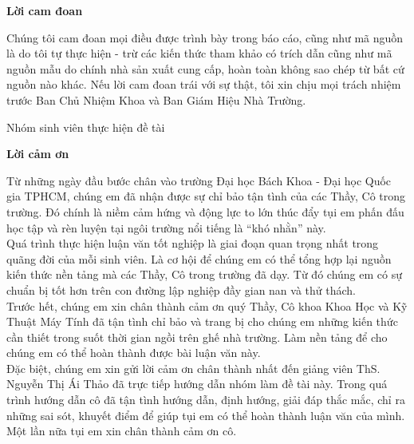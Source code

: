 \thispagestyle{empty}
\begin{center}
    \Large
    \textbf{Lời cam đoan}
    \vspace{1cm}
\end{center}

Chúng tôi cam đoan mọi điều được trình bày trong báo cáo, cũng như mã nguồn là do tôi tự thực hiện - trừ các kiến thức tham khảo có trích dẫn cũng như mã nguồn mẫu do chính nhà sản xuất cung cấp, hoàn toàn không sao chép từ bất cứ nguồn nào khác.
Nếu lời cam đoan trái với sự thật, tôi xin chịu mọi trách nhiệm trước Ban Chủ Nhiệm Khoa và Ban Giám Hiệu Nhà Trường.
\begin{flushright}
Nhóm sinh viên thực hiện đề tài\\

\end{flushright}

\newpage
\thispagestyle{plain}
\begin{center}
    \Large
    \textbf{Lời cảm ơn}
    \vspace{1cm}
\end{center}

Từ những ngày đầu bước chân vào trường Đại học Bách Khoa - Đại học Quốc gia TPHCM, chúng em đã nhận được sự chỉ bảo tận tình của các Thầy, Cô trong trường. Đó chính là niềm cảm hứng và động lực to lớn thúc đẩy tụi em phấn đấu học tập và rèn luyện tại ngôi trường nổi tiếng là “khó nhằn” này.\\
	
	Quá trình thực hiện luận văn tốt nghiệp là giai đoạn quan trọng nhất trong quãng đời của mỗi sinh viên. Là cơ hội để chúng em có thể tổng hợp lại nguồn kiến thức nền tảng mà các Thầy, Cô trong trường đã dạy. Từ đó chúng em có sự chuẩn bị tốt hơn trên con đường lập nghiệp đầy gian nan và thử thách.\\
	
	Trước hết, chúng em xin chân thành cảm ơn quý Thầy, Cô khoa Khoa Học và Kỹ Thuật Máy Tính đã tận tình chỉ bảo và trang bị cho chúng em những kiến thức cần thiết trong suốt thời gian ngồi trên ghế nhà trường. Làm nền tảng để cho chúng em có thể hoàn thành được bài luận văn này.\\ 
	
	Đặc biệt, chúng em xin gửi lời cảm ơn chân thành nhất đến giảng viên ThS. Nguyễn Thị Ái Thảo đã trực tiếp hướng dẫn nhóm làm đề tài này. Trong quá trình hướng dẫn cô đã tận tình hướng dẫn, định hướng, giải đáp thắc mắc, chỉ ra những sai sót, khuyết điểm để giúp tụi em có thể hoàn thành luận văn của mình. Một lần nữa tụi em xin chân thành cảm ơn cô.\\
	
